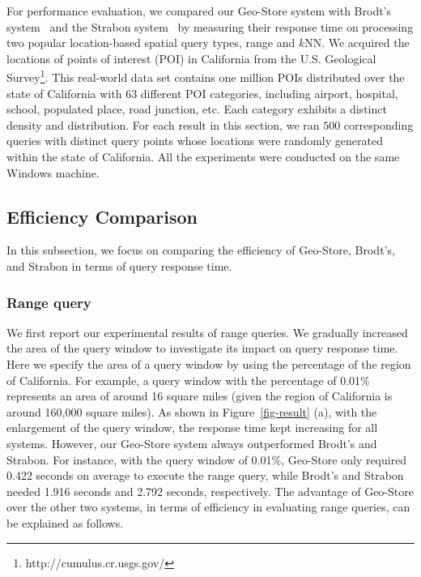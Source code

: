 For performance evaluation, we compared our Geo-Store system with Brodt's system~\cite{conf/gis/BrodtNM10} and the Strabon system~\cite{KyzirakosKK10} by measuring their response time on processing two popular location-based spatial query types, range and $k$NN. We acquired the locations of points of interest (POI) in California from the U.S. Geological Survey\footnote{http://cumulus.cr.usgs.gov/}. This real-world data set contains one million POIs distributed over the state of California with 63 different POI categories, including airport, hospital, school, populated place, road junction, etc. Each category exhibits a distinct density and distribution. For each result in this section, we ran $500$ corresponding queries with distinct query points whose locations were randomly generated within the state of California. All the experiments were conducted on the same Windows machine.


\subsection{Efficiency Comparison}

In this subsection, we focus on comparing the efficiency of Geo-Store, Brodt's, and Strabon in terms of query response time.

\subsubsection{Range query}

We first report our experimental results of range queries. We gradually increased the area of the query window to investigate its impact on query response time. Here we specify the area of a query window by using the percentage of the region of California. For example, a query window with the percentage of 0.01\% represents an area of around 16 square miles (given the region of California is around 160,000 square miles). As shown in Figure~\ref{fig-result} (a), with the enlargement of the query window, the response time kept increasing for all systems. However, our Geo-Store system always outperformed Brodt's and Strabon. For instance, with the query window of 0.01\%, Geo-Store only required 0.422 seconds on average to execute the range query, while Brodt's and Strabon needed 1.916 seconds and 2.792 seconds, respectively. The advantage of Geo-Store over the other two systems, in terms of efficiency in evaluating range queries, can be explained as follows.

